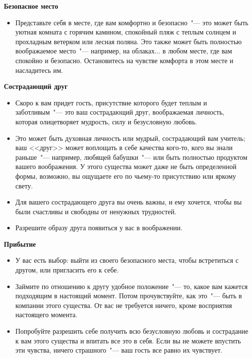 \vspace{3ex}

{\large \textbf{Безопасное место}}
\begin{itemize}
	\item Представьте себя в месте, где вам комфортно и безопасно~"--- это может быть уютная комната с горячим камином, спокойный пляж с теплым солнцем и прохладным ветерком или лесная поляна. Это также может быть полностью воображаемое место~"--- например, на облаках... в любом месте, где вам спокойно и безопасно. Остановитесь на чувстве комфорта в этом месте и насладитесь им.
\end{itemize}

\vspace{3ex}

{\large \textbf{Сострадающий друг}}
\begin{itemize}
	\item Скоро к вам придет гость, присутствие которого будет теплым и заботливым~"--- это ваш сострадающий друг, воображаемая личность, которая олицетворяет мудрость, силу и безусловную любовь.
	
	\item Это может быть духовная личность или мудрый, сострадающий вам учитель; ваш <<друг>> может воплощать в себе качества кого-то, кого вы знали раньше~"--- например, любящей бабушки~"--- или быть полностью продуктом вашего воображения. У этого существа может даже не быть определенной формы, возможно, вы ощущаете его по чьему-то присутствию или яркому свету.
	
	\item Для вашего сострадающего друга вы очень важны, и ему хочется, чтобы вы были счастливы и свободны от ненужных трудностей.
	
	\item Разрешите образу друга появиться у вас в воображении.
\end{itemize}

\vspace{3ex}

{\large \textbf{Прибытие}}
\begin{itemize}
	\item У вас есть выбор: выйти из своего безопасного места, чтобы встретиться с другом, или пригласить его к себе.
	
	\item Займите по отношению к другу удобное положение~"--- то, какое вам кажется подходящим в настоящий момент. Потом прочувствуйте, как это~"--- быть в компании этого существа. От вас не требуется ничего, кроме восприятия настоящего момента.
	
	\item Попробуйте разрешить себе получить всю безусловную любовь и сострадание к вам этого существа и впитать все это в себя. Если вы не можете впустить эти чувства, ничего страшного~"--- ваш гость все равно их чувствует.
\end{itemize}

